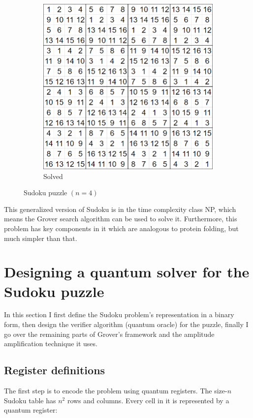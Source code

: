 \begin{figure}[H]
\begin{subfigure}{.49\linewidth}
    \includegraphics[width=\linewidth]{content/assets/03_grovers_algorithm/sudoku_4_solution.png}
    \caption{Solved}
  \end{subfigure}
  \caption{Sudoku puzzle $(n=4)$}
\end{figure}

This generalized version of Sudoku is in the time complexity class NP, which means the Grover search algorithm can be used to solve it. Furthermore, this problem has key components in it which are analogous to protein folding, but much simpler than that.

\section{Designing a quantum solver for the Sudoku puzzle}

In this section I first define the Sudoku problem's representation in a binary form, then design the verifier algorithm (quantum oracle) for the puzzle, finally I go over the remaining parts of Grover's framework and the amplitude amplification technique it uses.

\subsection{Register definitions}

The first step is to encode the problem using quantum registers. The size-$n$ Sudoku table has $n^2$ rows and columns. Every cell in it is represented by a quantum register:

